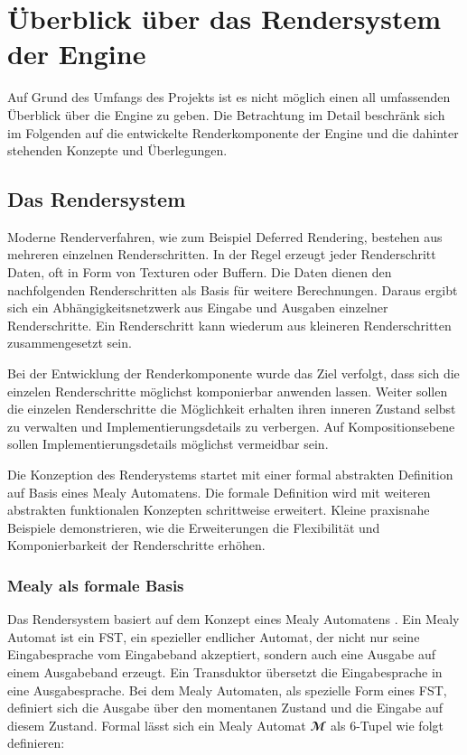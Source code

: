 \chapter{Überblick über das Rendersystem der Engine}
\label{chap:ueberblick-pipeline}

Auf Grund des Umfangs des Projekts ist es nicht möglich einen all umfassenden Überblick über die Engine zu geben. Die Betrachtung im Detail beschränk sich im Folgenden auf die entwickelte Renderkomponente der Engine und die dahinter stehenden Konzepte und Überlegungen.

\section{Das Rendersystem}

Moderne Renderverfahren, wie zum Beispiel Deferred Rendering, bestehen aus mehreren einzelnen Renderschritten. In der Regel erzeugt jeder Renderschritt Daten, oft in Form von Texturen oder Buffern. Die Daten dienen den nachfolgenden Renderschritten als Basis für weitere Berechnungen. Daraus ergibt sich ein Abhängigkeitsnetzwerk aus Eingabe und Ausgaben einzelner Renderschritte. Ein Renderschritt kann wiederum aus kleineren Renderschritten zusammengesetzt sein.

Bei der Entwicklung der Renderkomponente wurde das Ziel verfolgt, dass sich die einzelen Renderschritte möglichst komponierbar anwenden lassen. Weiter sollen die einzelen Renderschritte die Möglichkeit erhalten ihren inneren Zustand selbst zu verwalten und Implementierungsdetails zu verbergen. Auf Kompositionsebene sollen Implementierungsdetails möglichst vermeidbar sein.

Die Konzeption des Renderystems startet mit einer formal abstrakten Definition auf Basis eines Mealy Automatens. Die formale Definition wird mit weiteren abstrakten funktionalen Konzepten schrittweise erweitert. Kleine praxisnahe Beispiele demonstrieren, wie die Erweiterungen die Flexibilität und Komponierbarkeit der Renderschritte erhöhen.

\subsection{Mealy als formale Basis}

Das Rendersystem basiert auf dem Konzept eines Mealy Automatens \parencite{Mealy1955}. Ein Mealy Automat ist ein \acl{FST}, ein spezieller endlicher Automat, der nicht nur seine Eingabesprache vom Eingabeband akzeptiert, sondern auch eine Ausgabe auf einem Ausgabeband erzeugt. Ein Transduktor übersetzt die Eingabesprache in eine Ausgabesprache. Bei dem Mealy Automaten, als spezielle Form eines \ac{FST}, definiert sich die Ausgabe über den momentanen Zustand und die Eingabe auf diesem Zustand. Formal lässt sich ein Mealy Automat $\mathbfcal{M}$ als 6-Tupel wie folgt definieren:

